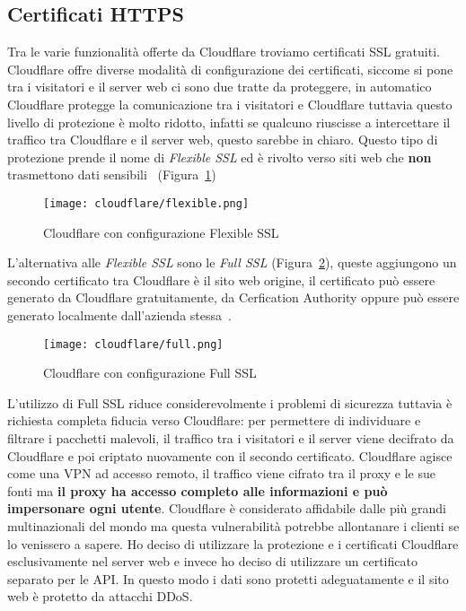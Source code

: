 \subsection{Certificati HTTPS}%
\label{sub:certificati}

Tra le varie funzionalit\`a offerte da Cloudflare troviamo certificati SSL gratuiti. Cloudflare offre diverse modalit\`a di configurazione dei certificati, siccome si pone tra i visitatori e il server web ci sono due tratte da proteggere, in automatico Cloudflare protegge la comunicazione tra i visitatori e Cloudflare tuttavia questo livello di protezione \`e molto ridotto, infatti se qualcuno riuscisse a intercettare il traffico tra Cloudflare e il server web, questo sarebbe in chiaro. Questo tipo di protezione prende il nome di \emph{Flexible SSL} ed \`e rivolto verso siti web che \textbf{non} trasmettono dati sensibili~\cite{cloudflare-ssl} (Figura~\ref{fig:flexiblessl})

\begin{figure}[htpb]
    \centering
    \texttt{[image: cloudflare/flexible.png]}
    \caption{Cloudflare con configurazione Flexible SSL}%
    \label{fig:flexiblessl}
\end{figure}

L'alternativa alle \emph{Flexible SSL} sono le \emph{Full SSL} (Figura~\ref{fig:fullssl}), queste aggiungono un secondo certificato tra Cloudflare \`e il sito web origine, il certificato pu\`o essere generato da Cloudflare gratuitamente, da Cerfication Authority oppure pu\`o essere generato localmente dall'azienda stessa~\cite{cloudflare-help}.

\begin{figure}[htpb]
    \centering
    \texttt{[image: cloudflare/full.png]}
    \caption{Cloudflare con configurazione Full SSL}%
    \label{fig:fullssl}
\end{figure}

L'utilizzo di Full SSL riduce considerevolmente i problemi di sicurezza tuttavia \`e richiesta completa fiducia verso Cloudflare: per permettere di individuare e filtrare i pacchetti malevoli, il traffico tra i visitatori e il server viene decifrato da Cloudflare e poi criptato nuovamente con il secondo certificato. Cloudflare agisce come una VPN ad accesso remoto, il traffico viene cifrato tra il proxy e le sue fonti ma \textbf{il proxy ha accesso completo alle informazioni e pu\`o impersonare ogni utente}. Cloudflare \`e considerato affidabile dalle pi\`u grandi multinazionali del mondo ma questa vulnerabilit\`a potrebbe allontanare i clienti se lo venissero a sapere. Ho deciso di utilizzare la protezione e i certificati Cloudflare esclusivamente nel server web e invece ho deciso di utilizzare un certificato separato per le API\@. In questo modo i dati sono protetti adeguatamente e il sito web \`e protetto da attacchi DDoS\@.
